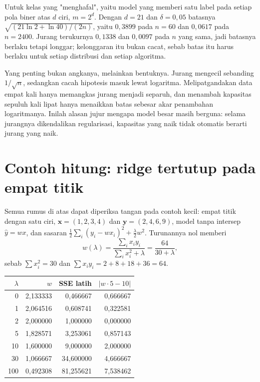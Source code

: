 Untuk kelas yang "menghafal", yaitu model yang memberi satu label pada setiap pola biner
atas $d$ ciri, $m=2^d$. Dengan $d=21$ dan $\delta=0{,}05$ batasnya
$\sqrt{(21\ln2+\ln40)/(2n)}$, yaitu $0{,}3899$ pada $n=60$ dan $0{,}0617$ pada
$n=2400$. Jurang terukurnya $0{,}1338$ dan $0{,}0097$ pada $n$ yang sama, jadi batasnya
berlaku tetapi longgar; kelonggaran itu bukan cacat, sebab batas itu harus berlaku untuk
setiap distribusi dan setiap algoritma.

Yang penting bukan angkanya, melainkan bentuknya. Jurang mengecil sebanding
$1/\sqrt n$, sedangkan cacah hipotesis masuk lewat logaritma. Melipatgandakan data empat
kali hanya memangkas jurang menjadi separuh, dan menambah kapasitas sepuluh kali lipat
hanya menaikkan batas sebesar akar penambahan logaritmanya. Inilah alasan jujur mengapa
model besar masih berguna: selama jurangnya dikendalikan regularisasi, kapasitas yang
naik tidak otomatis berarti jurang yang naik.

\section{Contoh hitung: ridge tertutup pada empat titik}

Semua rumus di atas dapat diperiksa tangan pada contoh kecil: empat titik dengan satu
ciri, $\mathbf{x}=(1,2,3,4)$ dan $\mathbf{y}=(2,4,6,9)$, model tanpa intersep
$\hat y=wx$, dan sasaran $\frac12\sum_i(y_i-wx_i)^2+\frac{\lambda}{2}w^2$. Turunannya
nol memberi
\[
w(\lambda)=\frac{\sum_ix_iy_i}{\sum_ix_i^2+\lambda}=\frac{64}{30+\lambda},
\]
sebab $\sum x_i^2=30$ dan $\sum x_iy_i=2+8+18+36=64$.

\begin{center}
\small
\begin{tabular}{rrrr}
\hline
$\lambda$ & $w$ & SSE latih & $|w\cdot5-10|$ \\
\hline
0   & 2,133333 & 0,466667 & 0,666667 \\
1   & 2,064516 & 0,608741 & 0,322581 \\
2   & 2,000000 & 1,000000 & 0,000000 \\
5   & 1,828571 & 3,253061 & 0,857143 \\
10  & 1,600000 & 9,000000 & 2,000000 \\
30  & 1,066667 & 34,600000 & 4,666667 \\
100 & 0,492308 & 81,255621 & 7,538462 \\
\hline
\end{tabular}
\end{center}

